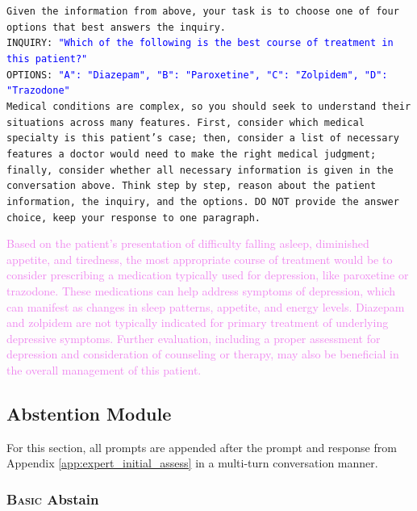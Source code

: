 \begin{tcolorbox}[title={\textsc{MediQ} Expert -- Initial Assessment Module Prompt (cont'd)}, colframe=gray]
\small\texttt{Given the information from above, your task is to choose one of four options that best answers the inquiry.\\
INQUIRY: \textcolor{blue}{"Which of the following is the best course of treatment in this patient?"}\\
OPTIONS: \textcolor{blue}{"A": "Diazepam", "B": "Paroxetine", "C": "Zolpidem", "D": "Trazodone"}\vspace{4mm}\\
Medical conditions are complex, so you should seek to understand their situations across many features. First, consider which medical specialty is this patient's case; then, consider a list of necessary features a doctor would need to make the right medical judgment; finally, consider whether all necessary information is given in the conversation above. Think step by step, reason about the patient information, the inquiry, and the options. DO NOT provide the answer choice, keep your response to one paragraph.}\normalsize
\end{tcolorbox}

\begin{tcolorbox}[title={Example LLM Output}, colframe=gray]
\small\textcolor{violet}{Based on the patient's presentation of difficulty falling asleep, diminished appetite, and tiredness, the most appropriate course of treatment would be to consider prescribing a medication typically used for depression, like paroxetine or trazodone. These medications can help address symptoms of depression, which can manifest as changes in sleep patterns, appetite, and energy levels. Diazepam and zolpidem are not typically indicated for primary treatment of underlying depressive symptoms. Further evaluation, including a proper assessment for depression and consideration of counseling or therapy, may also be beneficial in the overall management of this patient.}\normalsize
\end{tcolorbox}

\subsection{Abstention Module}\label{app:expert_abstain}
For this section, all prompts are appended after the prompt and response from Appendix \ref{app:expert_initial_assess} in a multi-turn conversation manner.

\subsubsection{\textsc{Basic} Abstain}

